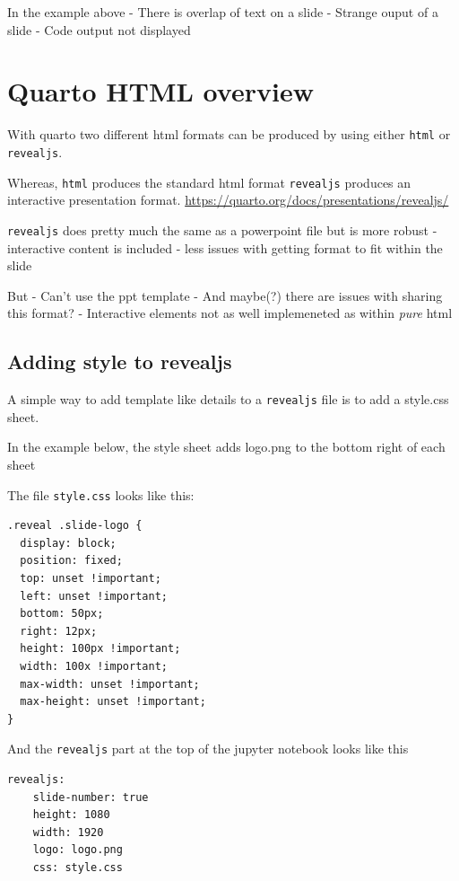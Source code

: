 \documentclass[
  letterpaper,
  DIV=11,
  numbers=noendperiod]{scrartcl}
\begin{document}
In the example above - There is overlap of text on a slide - Strange
ouput of a slide - Code output not displayed

\hypertarget{quarto-html-overview}{%
\section{Quarto HTML overview}\label{quarto-html-overview}}

With quarto two different html formats can be produced by using either
\texttt{html} or \texttt{revealjs}.

Whereas, \texttt{html} produces the standard html format
\texttt{revealjs} produces an interactive presentation format.
\url{https://quarto.org/docs/presentations/revealjs/}

\texttt{revealjs} does pretty much the same as a powerpoint file but is
more robust - interactive content is included - less issues with getting
format to fit within the slide

But - Can't use the ppt template - And maybe(?) there are issues with
sharing this format? - Interactive elements not as well implemeneted as
within \emph{pure} html

\hypertarget{adding-style-to-revealjs}{%
\subsection{Adding style to revealjs}\label{adding-style-to-revealjs}}

A simple way to add template like details to a \texttt{revealjs} file is
to add a style.css sheet.

In the example below, the style sheet adds logo.png to the bottom right
of each sheet

The file \texttt{style.css} looks like this:

\begin{verbatim}
.reveal .slide-logo {
  display: block;
  position: fixed;
  top: unset !important;
  left: unset !important;
  bottom: 50px;
  right: 12px;
  height: 100px !important;
  width: 100x !important;
  max-width: unset !important;
  max-height: unset !important;
}
\end{verbatim}

And the \texttt{revealjs} part at the top of the jupyter notebook looks
like this

\begin{verbatim}
revealjs:
    slide-number: true
    height: 1080
    width: 1920
    logo: logo.png
    css: style.css
\end{verbatim}
\end{document}
